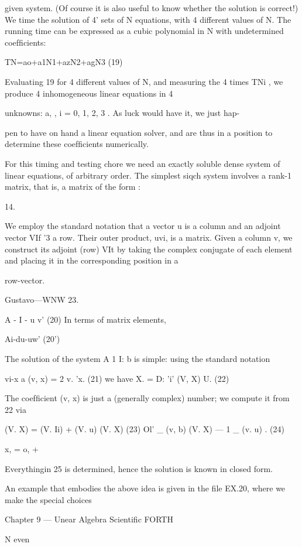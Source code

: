 {{{{{{{{given system. (Of course it is also useful to know whether the
solution is correct!) We time the solution of 4' sets of N equations,
with 4 different values of N. The running time can be expressed
as a cubic polynomial in N with undetermined coefﬁcients:

TN=ao+a1N1+azN2+agN3 (19)

Evaluating 19 for 4 different values of N, and measuring the 4
times TNi , we produce 4 inhomogeneous linear equations in 4

unknowns: a, , i = 0, 1, 2, 3 . As luck would have it, we just hap-

pen to have on hand a linear equation solver, and are thus in a
position to determine these coefﬁcients numerically.

For this timing and testing chore we need an exactly soluble dense
system of linear equations, of arbitrary order. The simplest siqch
system involves a rank-1 matrix, that is, a matrix of the form :

 

14.

We employ the standard notation that a vector u is a column and an adjoint vector VIf '3 a row.
Their outer product, uvi, is a matrix. Given a column v, we construct its adjoint (row) VIt by
taking the complex conjugate of each element and placing it in the corresponding position in a

row-vector.

Gustavo—WNW 23.

A - I - u v' (20)
In terms of matrix elements,

Ai-du-uw' (20')

The solution of the system A 1 I: b is simple: using the standard
notation

vi-x a (v, x) = 2 v. 'x. (21)
we have
X. = D: 'i' (V, X) U. (22)

The coefﬁcient (v, x) is just a (generally complex) number; we
compute it from 22 via

(V. X) = (V. Ii) + (V. u) (V. X) (23)
Ol'
\_ (v, b)
(V. X) — 1 \_ (v. u) . (24)

x, = o, + %

Everythingin 25 is determined, hence the solution is known in
closed form.

An example that embodies the above idea is given in the ﬁle
EX.20, where we make the special choices

Chapter 9 — Unear Algebra Scientiﬁc FORTH

N even

}}}}}}}}
